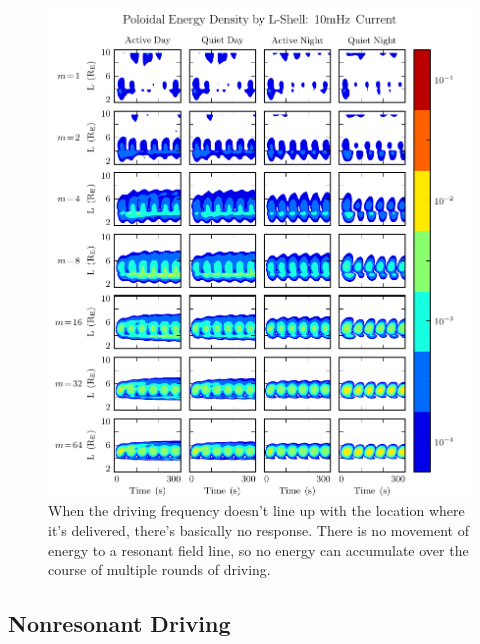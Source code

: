 \begin{figure}[H]
    \centering
    \includegraphics[width=\textwidth]{figures/ucolor_pol_010mHz.pdf}
    \caption[Poloidal Energy Density by L-Shell: 10mHz]{
      When the driving frequency doesn't line up with the location where it's delivered, there's basically no response. There is no movement of energy to a resonant field line, so no energy can accumulate over the course of multiple rounds of driving. 
    }
    \label{fig_ucolor_pol_010mHz}
\end{figure}



\subsection{Nonresonant Driving}

